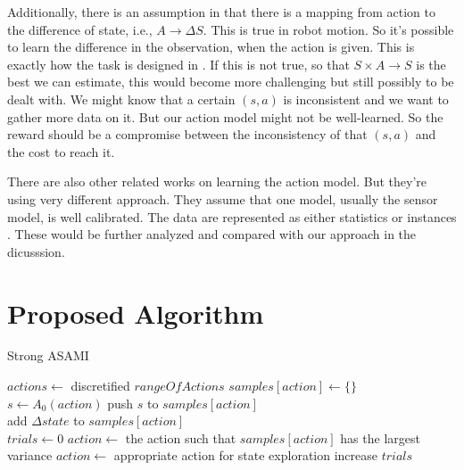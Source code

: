 \documentclass[10pt]{IEEEtran}
\begin{document}
Additionally, there is an assumption in \cite{CSJ06} that there is a
mapping from action to the difference of state, i.e., $A \rightarrow
\Delta S$.  This is true in robot motion. So it's possible to learn
the difference in the observation, when the action is given. This is
exactly how the task is designed in \cite{ICDL10-hester}. If this is
not true, so that $S \times A \rightarrow S$ is the best we can
estimate, this would become more challenging but still possibly to be
dealt with. We might know that a certain $(s, a)$ is inconsistent and
we want to gather more data on it. But our action model might not be
well-learned. So the reward should be a compromise between the
inconsistency of that $(s, a)$ and the cost to reach it.

There are also other related works on learning the action model. But
they're using very different approach. They assume that one model,
usually the sensor model, is well calibrated. The data are represented
as either statistics \cite{And_learningand} or instances
\cite{LNAI2007-ahmadi}. These would be further analyzed and compared
with our approach in the dicusssion.

\section{Proposed Algorithm}

\begin{algorithm*}
\caption{Strong ASAMI}\label{alg:asami}
\begin{algorithmic}[1]
    \State $actions \gets$ discretified $rangeOfActions$
        \State $samples[action] \gets \{\}$ \label{asa:actInit}
        \State $s \gets A_0(action)$
	\State push $s$ to $samples[action]$
    \EndFor
\EndFunction
\\
 \label{asa:update}
    \State add $\Delta state$ to $samples[action]$
\EndFunction
\\
 \label{asa:getAct}
\State $trials\gets 0$
            \State $action \gets$ the action such that $samples[action]$ has the largest variance
        \Else
            \State $action \gets$ appropriate action for state exploration
        \EndIf
        \State increase $trials$
    \EndWhile
\EndFunction
\end{algorithmic}
\end{algorithm*}
\end{document}
